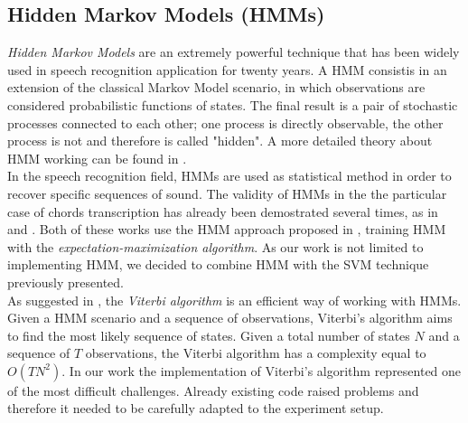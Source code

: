 \subsection{Hidden Markov Models (HMMs)}
\label{subsec:hmm}

\textit{Hidden Markov Models} are an extremely powerful technique that has been widely used in speech recognition application for twenty years. A HMM consistis in an extension of the classical Markov Model scenario, in which observations are considered probabilistic functions of states. The final result is a pair of stochastic processes connected to each other; one process is directly observable, the other process is not and therefore is called "hidden". A more detailed theory about HMM working can be found in \cite{LawrenceHMMtutorial}. \\
%
In the speech recognition field, HMMs are used as statistical method in order to recover specific sequences of sound. The validity of HMMs in the the particular case of chords transcription has already been demostrated several times, as in \cite{AlexDanEMplusHMM} and \cite{belpickMusic}. Both of these works use the HMM approach proposed in \cite{GoldMorganSpeechRecogn}, training HMM with the \textit{expectation-maximization algorithm}. As our work is not limited to implementing HMM, we decided to combine HMM with the SVM technique previously presented. \\
%
As suggested in \cite{GoldMorganSpeechRecogn}, the \textit{Viterbi algorithm} is an efficient way of working with HMMs. Given a HMM scenario and a sequence of observations, Viterbi's algorithm aims to find the most likely sequence of states. Given a total number of states $N$ and a sequence of $T$ observations, the Viterbi algorithm has a complexity equal to $O(TN^2)$. In our work the implementation of Viterbi's algorithm represented one of the most difficult challenges. Already existing code \cite{MatlabViterbi} raised problems and therefore it needed to be carefully adapted to the experiment setup.
